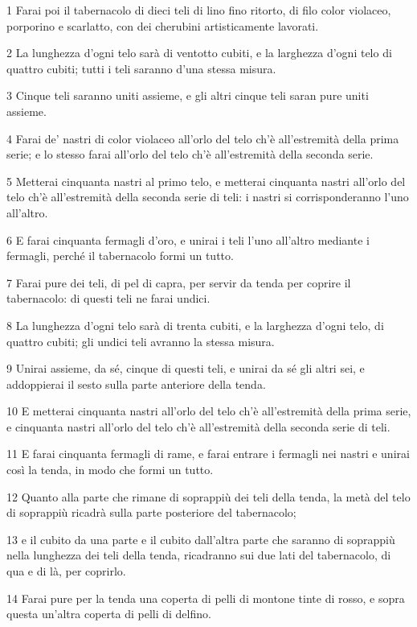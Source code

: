 \par 1 Farai poi il tabernacolo di dieci teli di lino fino ritorto, di filo color violaceo, porporino e scarlatto, con dei cherubini artisticamente lavorati.
\par 2 La lunghezza d'ogni telo sarà di ventotto cubiti, e la larghezza d'ogni telo di quattro cubiti; tutti i teli saranno d'una stessa misura.
\par 3 Cinque teli saranno uniti assieme, e gli altri cinque teli saran pure uniti assieme.
\par 4 Farai de' nastri di color violaceo all'orlo del telo ch'è all'estremità della prima serie; e lo stesso farai all'orlo del telo ch'è all'estremità della seconda serie.
\par 5 Metterai cinquanta nastri al primo telo, e metterai cinquanta nastri all'orlo del telo ch'è all'estremità della seconda serie di teli: i nastri si corrisponderanno l'uno all'altro.
\par 6 E farai cinquanta fermagli d'oro, e unirai i teli l'uno all'altro mediante i fermagli, perché il tabernacolo formi un tutto.
\par 7 Farai pure dei teli, di pel di capra, per servir da tenda per coprire il tabernacolo: di questi teli ne farai undici.
\par 8 La lunghezza d'ogni telo sarà di trenta cubiti, e la larghezza d'ogni telo, di quattro cubiti; gli undici teli avranno la stessa misura.
\par 9 Unirai assieme, da sé, cinque di questi teli, e unirai da sé gli altri sei, e addoppierai il sesto sulla parte anteriore della tenda.
\par 10 E metterai cinquanta nastri all'orlo del telo ch'è all'estremità della prima serie, e cinquanta nastri all'orlo del telo ch'è all'estremità della seconda serie di teli.
\par 11 E farai cinquanta fermagli di rame, e farai entrare i fermagli nei nastri e unirai così la tenda, in modo che formi un tutto.
\par 12 Quanto alla parte che rimane di soprappiù dei teli della tenda, la metà del telo di soprappiù ricadrà sulla parte posteriore del tabernacolo;
\par 13 e il cubito da una parte e il cubito dall'altra parte che saranno di soprappiù nella lunghezza dei teli della tenda, ricadranno sui due lati del tabernacolo, di qua e di là, per coprirlo.
\par 14 Farai pure per la tenda una coperta di pelli di montone tinte di rosso, e sopra questa un'altra coperta di pelli di delfino.
